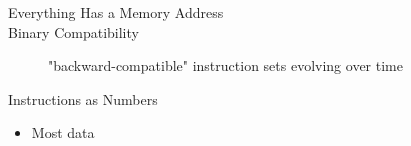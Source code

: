 \begin{description}
    \item[Everything Has a Memory Address]
    \item[Binary Compatibility]
    
    "backward-compatible" instruction sets evolving over time
    \item[]
\end{description}

Instructions as Numbers
\begin{itemize}
    \item Most data
\end{itemize}